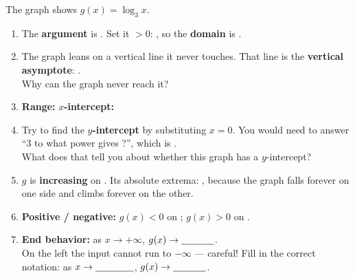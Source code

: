 \documentclass[10pt]{article}
\newcommand{\lgrid}[4]{%
  \draw[step=1, linegray!40, very thin] (#1,#3) grid (#2,#4);
  \draw[->, semithick, charcoal] (#1,0)--(#2,0) node[below right, font=\scriptsize]{$x$};
  \draw[->, semithick, charcoal] (0,#3)--(0,#4) node[left, font=\scriptsize]{$y$};}
\newcommand{\logcurve}[5]{\draw[very thick, forest, domain=#4:#5, samples=120, smooth]
  plot ({pow(#1,\x-(#3))+(#2)},{\x});}
\begin{document}
\begin{tcolorbox}[colback=white, colframe=black!40, title=\textbf{Tier R --- Remediate},
    fonttitle=\bfseries, arc=1.5mm, left=3mm, right=3mm, top=2mm, bottom=2mm, breakable]
The graph shows $g(x) = \log_3 x$.
\begin{center}
\end{center}
\begin{enumerate}[leftmargin=1.7em, itemsep=7pt]
  \item The \textbf{argument} is \blank{2.0cm}. Set it $>0$: \blank{2.4cm}, so the
        \textbf{domain} is \blank{3.0cm}.
  \item The graph leans on a vertical line it never touches. That line is the \textbf{vertical
        asymptote}: \blank{1.8cm}. \\
        Why can the graph never reach it? \blank{5.4cm}
  \item \textbf{Range:} \blank{3.0cm} \quad \textbf{$x$-intercept:} \blank{1.8cm}
  \item Try to find the \textbf{$y$-intercept} by substituting $x=0$. You would need to answer
        ``$3$ to what power gives \blank{1.0cm}?'', which is \blank{2.6cm}. \\
        What does that tell you about whether this graph has a $y$-intercept? \blank{5.4cm}
  \item $g$ is \textbf{increasing} on \blank{2.6cm}. \quad Its absolute extrema:
        \blank{2.0cm}, because the graph falls forever on one side and climbs forever on the other.
  \item \textbf{Positive / negative:} $g(x)<0$ on \blank{2.4cm}; \quad $g(x)>0$ on
        \blank{2.4cm}.
  \item \textbf{End behavior:} as $x\to+\infty$, $g(x)\to\blank{1.2cm}$. \\
        On the left the input cannot run to $-\infty$ --- careful! Fill in the correct notation:
        as $x\to\blank{1.4cm}$, $g(x)\to\blank{1.2cm}$.
\end{enumerate}
\end{tcolorbox}
\end{document}

